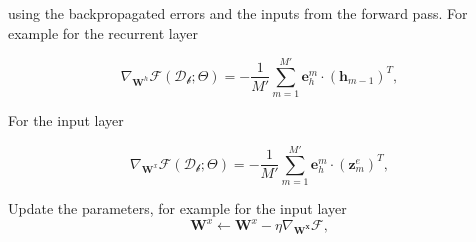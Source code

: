 \begin{algorithm}
\begin{algorithmic}[1]
	\ENDFOR	

	\vspace{0.3cm}
     using the backpropagated errors and the inputs from the forward pass. For example for the recurrent layer

        $$\nabla_{\mathbf{W}^h}\mathcal{F}(\mathcal{D_b};\Theta)  = -\frac{1}{M'} \sum_{m=1}^{M'} \mathbf{e}^m_h \cdot \left(\mathbf{h}_{m-1}\right)^T,$$

    For the input layer

        $$\nabla_{\mathbf{W}^x}\mathcal{F}(\mathcal{D_b};\Theta)  = -\frac{1}{M'} \sum_{m=1}^{M'} \mathbf{e}^m_h \cdot \left(\mathbf{z}^e_{m}\right)^T,$$

	\vspace{0.3cm}
    \STATE Update the parameters, for example for the input layer
        $$\mathbf{W}^x \leftarrow \mathbf{W}^x - \eta \nabla_\mathbf{W^x}\mathcal{F},$$
	\ENDFOR
	\ENDFOR
\end{algorithmic}
\end{algorithm}


